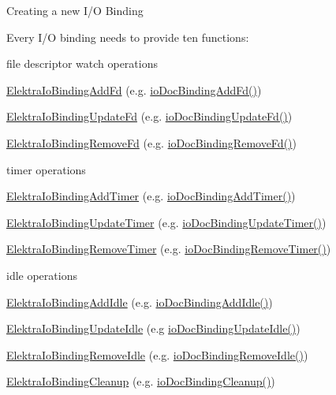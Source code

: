 \begin{DoxyParagraph}{Creating a new I/O Binding}

\end{DoxyParagraph}
Every I/O binding needs to provide ten functions\+:
\begin{DoxyItemize}
\item file descriptor watch operations
\begin{DoxyItemize}
\item \hyperlink{kdbio_8h_addbfc876a15d0b8864196c67ab3e5a26}{Elektra\+Io\+Binding\+Add\+Fd} (e.\+g. \hyperlink{io__doc_8c_ae9b5f4e891829f3af8563e8160e1bd02}{io\+Doc\+Binding\+Add\+Fd()})
\item \hyperlink{kdbio_8h_acdb75b8df54c2b64980cf541b2704f37}{Elektra\+Io\+Binding\+Update\+Fd} (e.\+g. \hyperlink{io__doc_8c_a172a781f21310745a16cb24c578c4656}{io\+Doc\+Binding\+Update\+Fd()})
\item \hyperlink{kdbio_8h_af1d03ff367130892ec3d1f4788eb8277}{Elektra\+Io\+Binding\+Remove\+Fd} (e.\+g. \hyperlink{io__doc_8c_ac5a985c3d54b2c06838d8af1719fcf09}{io\+Doc\+Binding\+Remove\+Fd()})
\end{DoxyItemize}
\item timer operations
\begin{DoxyItemize}
\item \hyperlink{kdbio_8h_a61a8f37e371b8360c92222f58f4691eb}{Elektra\+Io\+Binding\+Add\+Timer} (e.\+g. \hyperlink{io__doc_8c_a4392a7bfa23513cf4cff7bcf4b0c4c68}{io\+Doc\+Binding\+Add\+Timer()})
\item \hyperlink{kdbio_8h_ab50f6288380aba507d27a0d66e00d8b4}{Elektra\+Io\+Binding\+Update\+Timer} (e.\+g. \hyperlink{io__doc_8c_a1ed16f0e61d2c7c59735b321b7080dec}{io\+Doc\+Binding\+Update\+Timer()})
\item \hyperlink{kdbio_8h_a00c0ffb60386fd65869367280d1ffe62}{Elektra\+Io\+Binding\+Remove\+Timer} (e.\+g. \hyperlink{io__doc_8c_afc27d1f174e30aab500a9e94a366f8ec}{io\+Doc\+Binding\+Remove\+Timer()})
\end{DoxyItemize}
\item idle operations
\begin{DoxyItemize}
\item \hyperlink{kdbio_8h_adcfdf9f514441cabfbfd064fe4021522}{Elektra\+Io\+Binding\+Add\+Idle} (e.\+g. \hyperlink{io__doc_8c_ae7db8c833350176d2570cc4a010c2692}{io\+Doc\+Binding\+Add\+Idle()})
\item \hyperlink{kdbio_8h_af4fa5e05e59022b5d5421932882fc966}{Elektra\+Io\+Binding\+Update\+Idle} (e.\+g \hyperlink{io__doc_8c_a9b8faf0861123676a0a826987962552f}{io\+Doc\+Binding\+Update\+Idle()})
\item \hyperlink{kdbio_8h_a23b523b54e70df91a85c95583b6c958f}{Elektra\+Io\+Binding\+Remove\+Idle} (e.\+g. \hyperlink{io__doc_8c_ad813afce995620df6542c3cdd32b23e6}{io\+Doc\+Binding\+Remove\+Idle()})
\end{DoxyItemize}
\item \hyperlink{kdbio_8h_a08d3ce531bbd1c5acedbdb9822b24d6d}{Elektra\+Io\+Binding\+Cleanup} (e.\+g. \hyperlink{io__doc_8c_a8bfb50f3c81b02ba9f0ad1a2f24afb6d}{io\+Doc\+Binding\+Cleanup()})
\end{DoxyItemize}

